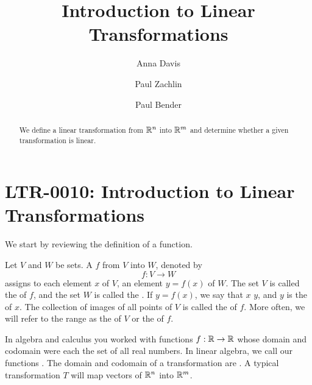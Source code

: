 \documentclass{ximera}
\author{Anna Davis \and Paul Zachlin \and Paul Bender} \title{Introduction to Linear Transformations} \license{CC-BY 4.0}
\begin{document}
\begin{abstract}
  We define a linear transformation from $\mathbb{R}^n$ into $\mathbb{R}^m$ and determine whether a given transformation is linear.
\end{abstract}
\maketitle


\section*{LTR-0010: Introduction to Linear Transformations}

We start by reviewing the definition of a function.

\begin{definition} \label{def:function}
  
Let $V$ and $W$ be sets.  A  $f$ from $V$ into $W$, denoted by 
$$f:V\rightarrow W$$
assigns to each element $x$ of $V$, an element $y=f(x)$ of $W$. 
\vskip 10pt
The set $V$ is called the  of $f$, and the set $W$ is called the .
\vskip 10pt
If $y=f(x)$, we say that $x$  $y$, and $y$ is the  of $x$.
\vskip 10pt
The collection of images of all points of $V$ is called the  of $f$.  More often, we will refer to the range as the  of $V$ or the  of $f$.
  
\end{definition}


In algebra and calculus you worked with functions $f:\mathbb{R}\rightarrow\mathbb{R}$ whose domain and codomain were each the set of all real numbers.  In linear algebra, we call our functions .  The domain and codomain of a transformation are .  A typical transformation $T$ will map vectors of $\mathbb{R}^n$ into $\mathbb{R}^m$.
\end{document}
